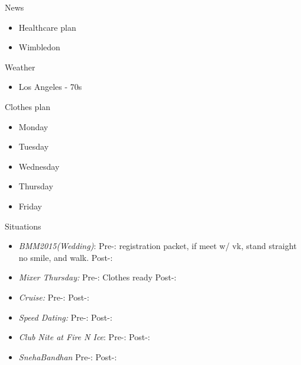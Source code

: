 \documentclass[serif, mathserif, final]{beamer}
\begin{document}
\begin{frame}{}
\begin{columns}
    \begin{column}{0.20\linewidth}
      \begin{block}{News}
    \begin{itemize} 
      
    \item \tiny Healthcare plan 
      \tiny \item \tiny Wimbledon 
    \end{itemize}
      \end{block}
      \begin{block}{Weather} 
        \begin{itemize}
        \item \tiny Los Angeles - 70s 
        \end{itemize}
      \end{block} 
      \begin{block}{Clothes plan} 
        \begin{itemize} 
          \tiny \item \tiny Monday
        \item \tiny Tuesday
        \item \tiny Wednesday
        \item \tiny Thursday
        \item \tiny Friday
        \end{itemize} 
      \end{block}
      
      \begin{block}{Situations}
        \begin{itemize}
          
        \item \tiny \textit{BMM2015(Wedding)}: Pre-: registration
          packet, if meet w/ vk, stand straight no smile, and walk. 
          Post-: 


        \item \tiny \textit{Mixer Thursday:} Pre-: Clothes ready Post-: 
        \item \tiny \textit{Cruise:} Pre-:  Post-: 
        \item \tiny \textit{Speed Dating:} Pre-:  Post-: 

        \item \tiny \textit{Club Nite at Fire N Ice}: Pre-:  Post-: 
        \item \tiny \textit{SnehaBandhan} Pre-: Post-: 




\end{itemize}
\end{block}
\end{column}
\end{columns}
\end{frame}
\end{document}
